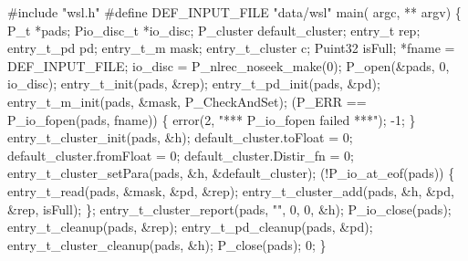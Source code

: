\begin{centercode}
#include "wsl.h"
#define DEF\_INPUT\_FILE  "data/wsl"
\mbox{}
 main( argc, ** argv) \{
  P\_t                   *pads;
  Pio\_disc\_t           *io\_disc;
  P\_cluster             default\_cluster;
  entry\_t               rep;
  entry\_t\_pd           pd;
  entry\_t\_m            mask;
  entry\_t\_cluster      c;
  Puint32                isFull;
                *fname = DEF\_INPUT\_FILE;
\mbox{}
  io\_disc = P\_nlrec\_noseek\_make(0);
  P\_open(&pads, 0, io\_disc);
\mbox{}
  entry\_t\_init(pads, &rep);
  entry\_t\_pd\_init(pads, &pd);
  entry\_t\_m\_init(pads, &mask, P\_CheckAndSet);
\mbox{}
   (P\_ERR == P\_io\_fopen(pads, fname)) \{
    error(2, "*** P\_io\_fopen failed ***");
     -1;
  \}
\mbox{}
  entry\_t\_cluster\_init(pads, &h);
  default\_cluster.toFloat = 0;
  default\_cluster.fromFloat = 0;
  default\_cluster.Distir\_fn = 0;
  entry\_t\_cluster\_setPara(pads, &h, &default\_cluster);
   (!P\_io\_at\_eof(pads)) \{
    entry\_t\_read(pads, &mask, &pd, &rep);
    entry\_t\_cluster\_add(pads, &h, &pd, &rep, isFull);
  \};
  entry\_t\_cluster\_report(pads, "", 0, 0, &h);
\mbox{}
  P\_io\_close(pads);
  entry\_t\_cleanup(pads, &rep);
  entry\_t\_pd\_cleanup(pads, &pd);
  entry\_t\_cluster\_cleanup(pads, &h);
  P\_close(pads);
   0;
\}
\end{centercode}
